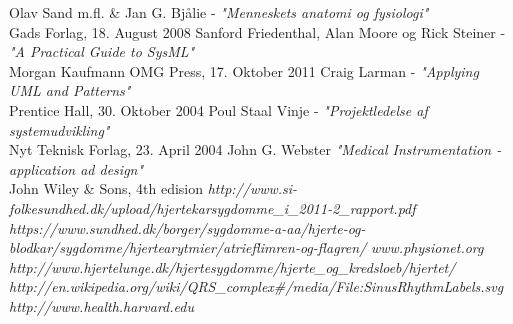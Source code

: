 \begin{thebibliography}{9}
 Olav Sand m.fl. \& Jan G. Bjålie - \textit{"Menneskets anatomi og fysiologi"}\\ Gads Forlag, 18. August 2008
 Sanford Friedenthal, Alan Moore og Rick Steiner - \textit{"A Practical Guide to SysML"} \\Morgan Kaufmann OMG Press, 17. Oktober 2011
 Craig Larman -
	\textit{"Applying UML and Patterns"}\\ Prentice Hall, 30. Oktober 2004
 Poul Staal Vinje - \textit{"Projektledelse af systemudvikling"}\\ Nyt Teknisk Forlag, 23. April 2004
 John G. Webster \textit{"Medical Instrumentation - application ad design"}\\ John Wiley & Sons, 4th edision
 \textit{http://www.si-folkesundhed.dk/upload/hjertekarsygdomme\_i\_2011-2\_rapport.pdf}
 \textit{https://www.sundhed.dk/borger/sygdomme-a-aa/hjerte-og-blodkar/sygdomme/hjertearytmier/atrieflimren-og-flagren/}
 \textit{www.physionet.org}
\textit{http://www.hjertelunge.dk/hjertesygdomme/hjerte\_og\_kredsloeb/hjertet/}
 \textit{http://en.wikipedia.org/wiki/QRS\_complex\#/media/File:SinusRhythmLabels.svg}
 \textit{http://www.health.harvard.edu} 

\end{thebibliography}